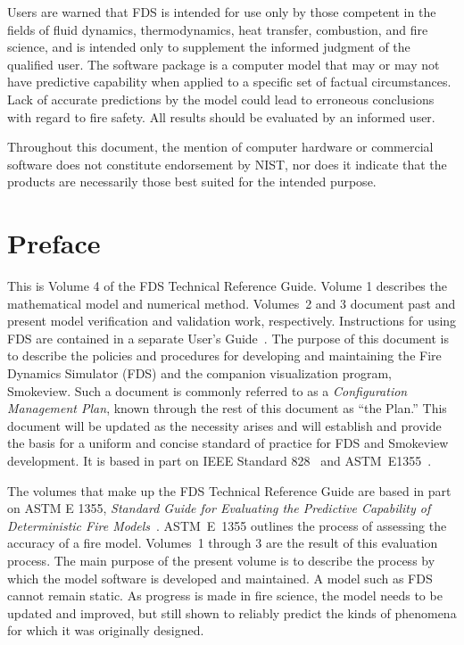 \documentclass[11pt]{book}
\begin{document}
Users are warned that FDS is intended for use only by those competent
in the fields of fluid dynamics, thermodynamics, heat transfer, combustion, and fire science,
and is intended only to supplement the informed judgment of the qualified user.
The software package is a computer model that may or may not have predictive
capability when applied to a specific set of factual circumstances.
Lack of accurate predictions by the model could lead to erroneous
conclusions with regard to fire safety. All results should be evaluated by an informed user.

Throughout this document, the mention of computer hardware or commercial
software does not constitute endorsement by NIST, nor does it indicate that
the products are necessarily those best suited for the intended purpose.

\chapter{Preface}

This is Volume 4 of the FDS Technical Reference Guide. Volume 1 describes the mathematical model and numerical method. Volumes~2 and 3 document past and
present model verification and validation work, respectively. Instructions for using FDS are contained in a separate User's Guide~\cite{FDS_Users_Guide}. The purpose of this document is to describe the policies and procedures for developing and maintaining the Fire Dynamics
Simulator (FDS) and the companion visualization program, Smokeview. Such a document is commonly referred to as a {\em Configuration Management Plan}, known through the rest of this document as ``the Plan.'' This document will be updated as the necessity arises and will establish and provide the basis for a uniform and concise standard of practice for FDS and Smokeview
development. It is based in part on IEEE Standard 828~\cite{IEEE-828} and ASTM~E1355~\cite{ASTM:E1355}.

The volumes that make up the FDS Technical Reference Guide are based in part on ASTM E 1355, {\em Standard Guide for Evaluating the Predictive Capability of
Deterministic Fire Models}~\cite{ASTM:E1355}. ASTM~E~1355 outlines the process of assessing the accuracy of a fire model. Volumes~1 through 3 are the
result of this evaluation process. The main purpose of the present volume is to describe the process by which the model software is developed and maintained. A model such
as FDS cannot remain static. As progress is made in fire science, the model needs to be updated and improved, but still shown to reliably predict the kinds of
phenomena for which it was originally designed.
\end{document}
